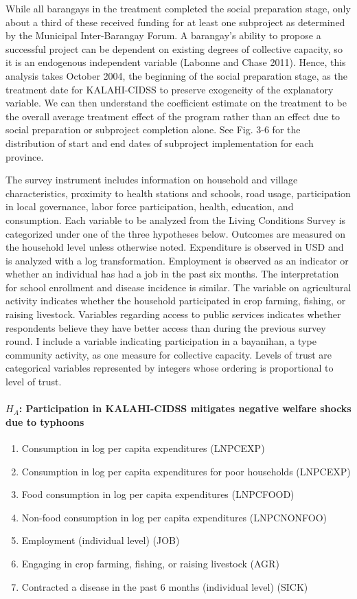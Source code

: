 \documentclass[12pt]{article}
\begin{document}
	While all barangays in the treatment completed the social preparation stage, only about a third of these received funding for at least one subproject as determined by the Municipal Inter-Barangay Forum. A barangay's ability to propose a successful project can be dependent on existing degrees of collective capacity, so it is an endogenous independent variable (Labonne and Chase 2011). Hence, this analysis takes October 2004, the beginning of the social preparation stage, as the treatment date for KALAHI-CIDSS to preserve exogeneity of the explanatory variable. We can then understand the coefficient estimate on the treatment to be the overall average treatment effect of the program rather than an effect due to social preparation or subproject completion alone. See Fig. 3-6 for the distribution of start and end dates of subproject implementation for each province. 

 	The survey instrument includes information on household and village characteristics, proximity to health stations and schools, road usage, participation in local governance, labor force participation, health, education, and consumption. Each variable to be analyzed from the Living Conditions Survey is categorized under one of the three hypotheses below. Outcomes are measured on the household level unless otherwise noted. Expenditure is observed in USD and is analyzed with a log transformation. Employment is observed as an indicator or whether an individual has had a job in the past six months. The interpretation for school enrollment and disease incidence is similar. The variable on agricultural activity indicates whether the household participated in crop farming, fishing, or raising livestock. Variables regarding access to public services indicates whether respondents believe they have better access than during the previous survey round. I include a variable indicating participation in a bayanihan, a type community activity, as one measure for collective capacity. Levels of trust are categorical variables represented by integers whose ordering is proportional to level of trust. 

 	\paragraph{$H_A$: Participation in KALAHI-CIDSS mitigates negative welfare shocks due to typhoons}

		\begin{enumerate}
		\item Consumption in log per capita expenditures (LNPCEXP)
		\item Consumption in log per capita expenditures for poor households (LNPCEXP)
		\item Food consumption in log per capita expenditures (LNPCFOOD)
		\item Non-food consumption in log per capita expenditures (LNPCNONFOO)
		\item Employment (individual level) (JOB)
		\item Engaging in crop farming, fishing, or raising livestock (AGR)
		\item Contracted a disease in the past 6 months (individual level) (SICK)
		\end{enumerate}
\end{document}
